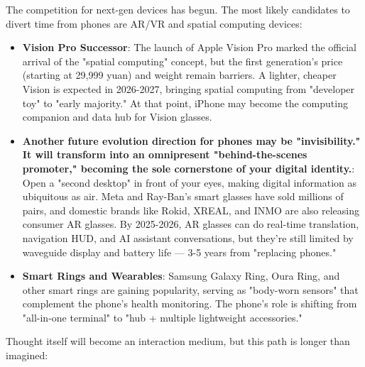 


The competition for next-gen devices has begun. The most likely candidates to divert time from phones are AR/VR and spatial computing devices:

\begin{itemize}
  \item \textbf{Vision Pro Successor}: The launch of Apple Vision Pro marked the official arrival of the "spatial computing" concept, but the first generation's price (starting at 29,999 yuan) and weight remain barriers. A lighter, cheaper Vision is expected in 2026-2027, bringing spatial computing from "developer toy" to "early majority." At that point, iPhone may become the computing companion and data hub for Vision glasses.
  \item \textbf{Another future evolution direction for phones may be "invisibility." It will transform into an omnipresent "behind-the-scenes promoter," becoming the sole cornerstone of your digital identity.}: Open a "second desktop" in front of your eyes, making digital information as ubiquitous as air. Meta and Ray-Ban's smart glasses have sold millions of pairs, and domestic brands like Rokid, XREAL, and INMO are also releasing consumer AR glasses. By 2025-2026, AR glasses can do real-time translation, navigation HUD, and AI assistant conversations, but they're still limited by waveguide display and battery life — 3-5 years from "replacing phones."
  \item \textbf{Smart Rings and Wearables}: Samsung Galaxy Ring, Oura Ring, and other smart rings are gaining popularity, serving as "body-worn sensors" that complement the phone's health monitoring. The phone's role is shifting from "all-in-one terminal" to "hub + multiple lightweight accessories."
\end{itemize}


Thought itself will become an interaction medium, but this path is longer than imagined:

